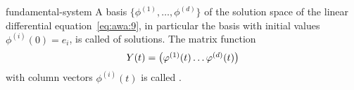 \begin{Definition}{fundamental-system}
  A basis $\{\phi^{(1)},\dots,\phi^{(d)}\}$ of the solution space of
  the linear differential equation~\eqref{eq:awa:9}, in particular the
  basis with initial values $\phi^{(i)}(0) = e_i$, is called
   of solutions.  The
  matrix function
  \begin{gather}
    \label{eq:awa:12}
    Y(t) =
    \begin{pmatrix}
      \varphi^{(1)}(t)\dots\varphi^{(d)}(t)
    \end{pmatrix}
  \end{gather}
  with column vectors $\phi^{(i)}(t)$ is called
  .
\end{Definition}


